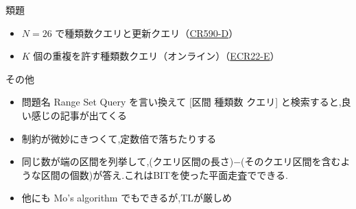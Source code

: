 \documentclass[dvipdfmx,12pt]{beamer}%
\begin{document}
\begin{frame}
\begin{exampleblock}{類題}
\begin{itemize}
	\item $ N = 26 $ で種類数クエリと更新クエリ（\href{https://codeforces.com/contest/1234/problem/D}{CR590-D}）
	\item $ K $ 個の重複を許す種類数クエリ（オンライン）（\href{https://codeforces.com/problemset/problem/813/E}{ECR22-E}）
\end{itemize}
\end{exampleblock}

\begin{alertblock}{その他}
\begin{itemize}
	\item 問題名  Range Set Query を言い換えて [区間 種類数 クエリ] と検索すると,良い感じの記事が出てくる
	\item 制約が微妙にきつくて,定数倍で落ちたりする
	\item 同じ数が端の区間を列挙して,(クエリ区間の長さ)$-$(そのクエリ区間を含むような区間の個数)が答え.これはBITを使った平面走査でできる.
	\item 他にも Mo's algorithm でもできるが,TLが厳しめ
\end{itemize}
\end{alertblock}

\end{frame}

%
%
\end{document}
